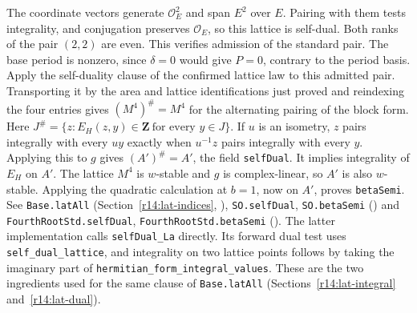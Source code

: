 The coordinate vectors generate $\mathcal O_E^2$ and span $E^2$ over $E$.
Pairing with them tests integrality, and conjugation preserves
$\mathcal O_E$, so this lattice is self-dual. Both ranks of the pair
$(2,2)$ are even. This verifies admission of the standard pair. The base period is nonzero, since
$\delta=0$ would give $P=0$, contrary to the period basis. Apply the
self-duality clause of the confirmed lattice law to this admitted pair.
Transporting it by the area and lattice identifications just proved
and reindexing the four entries gives
$(M^4)^\#=M^4$ for the alternating pairing of the block form.
Here $J^\#=\{z:E_H(z,y)\in\mathbf Z\ \text{for every }y\in J\}$.
If $u$ is an isometry, $z$ pairs integrally with every $uy$ exactly
when $u^{-1}z$ pairs integrally with every $y$. Applying this to
$g$ gives $(A')^\#=A'$, the field \nolinkurl{selfDual}.
It implies integrality of $E_H$ on $A'$. The lattice $M^4$ is
$w$-stable and $g$ is complex-linear, so $A'$ is also $w$-stable.
Applying the quadratic calculation at $b=1$, now on $A'$, proves
\nolinkurl{betaSemi}.
See \nolinkurl{Base.latAll} (Section~\ref{r14:lat-indices},
),
\nolinkurl{SO.selfDual}, \nolinkurl{SO.betaSemi}
() and
\nolinkurl{FourthRootStd.selfDual}, \nolinkurl{FourthRootStd.betaSemi}
().
The latter implementation calls \nolinkurl{selfDual_La} directly. Its
forward dual test uses \nolinkurl{self_dual_lattice}, and integrality on
two lattice points follows by taking the imaginary part of
\nolinkurl{hermitian_form_integral_values}. These are the two ingredients
used for the same clause of \nolinkurl{Base.latAll}
(Sections~\ref{r14:lat-integral} and~\ref{r14:lat-dual}).

